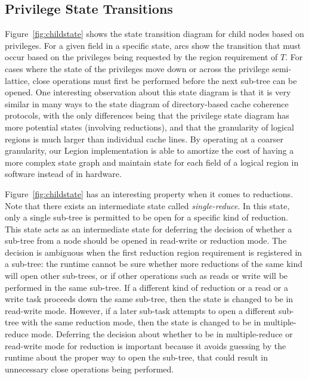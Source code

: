 \subsection{Privilege State Transitions}
\label{subsec:statetrans}
Figure~\ref{fig:childstate} shows the state transition
diagram for child nodes based on privileges. For
a given field in a specific state, arcs
show the transition that must occur based on the
privileges being requested by the region requirement
of $T$.  For cases where the state of the privileges
move down or across the privilege semi-lattice, close
operations must first be performed before the next
sub-tree can be opened. One interesting observation 
about this state diagram is that it is very similar
in many ways to the state diagram of directory-based
cache coherence protocols, with the only differences
being that the privilege state diagram has more potential
states (involving reductions), and that the granularity
of logical regions is much larger than individual cache
lines. By operating at a coarser granularity, our Legion
implementation is able to amortize the cost of 
having a more complex state graph and maintain state
for each field of a logical region in software instead 
of in hardware.

Figure~\ref{fig:childstate} has an interesting property
when it comes to reductions. Note that there exists
an intermediate state called {\em single-reduce}. In
this state, only a single sub-tree is permitted to be
open for a specific kind of reduction. This state acts
as an intermediate state for deferring the decision of 
whether a sub-tree from a node should be opened in 
read-write or reduction mode. The decision is ambiguous
when the first reduction region requirement is registered
in a sub-tree: the runtime cannot be sure whether more 
reductions of the same kind will open other sub-trees, or 
if other operations such as reads or write will be 
performed in the same sub-tree.  If a different kind of
reduction or a read or a write task proceeds down the
same sub-tree, then the state is changed to be in
read-write mode.  However, if a later sub-task 
attempts to open a different sub-tree with the same
reduction mode, then the state is changed to be
in multiple-reduce mode. Deferring the decision about
whether to be in multiple-reduce or read-write mode
for reduction is important because it avoids guessing
by the runtime about the proper way to open the sub-tree,
that could result in unnecessary close operations 
being performed.

